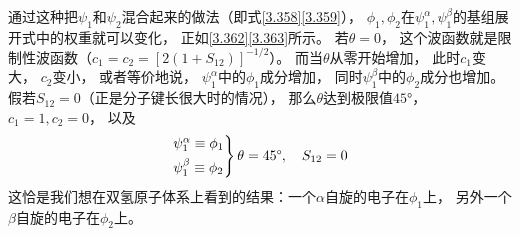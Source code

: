 通过这种把$\psi_1$和$\psi_2$混合起来的做法（即式\eqref{3.358}\eqref{3.359}），
$\phi_1,\phi_2$在$\psi_1^\alpha,\psi_1^\beta$的基组展开式中的权重就可以变化，
正如\eqref{3.362}\eqref{3.363}所示。
若$\theta=0$，
这个波函数就是限制性波函数（$c_1=c_2=[2(1+S_{12} )]^{-1/2}$）。
而当$\theta$从零开始增加，
此时$c_1$变大，
$c_2$变小，
或者等价地说，
$\psi_1^\alpha$中的$\phi_1$成分增加，
同时$\psi_1^\beta$中的$\phi_2$成分也增加。
假若$S_{12}=0$（正是分子键长很大时的情况），
那么$\theta$达到极限值$45\text{°}$，
$c_1=1,c_2=0$，
以及
\begin{align}
	\begin{rcases*}
		\psi_1^\alpha \equiv \phi_1\\
		\psi_1^\beta \equiv \phi_2
	\end{rcases*}\theta = 45\text{°},\quad S_{12}=0
\end{align}
这恰是我们想在双氢原子体系上看到的结果：一个$\alpha$自旋的电子在$\phi_1$上，
另外一个$\beta$自旋的电子在$\phi_2$上。









\theendnotes
